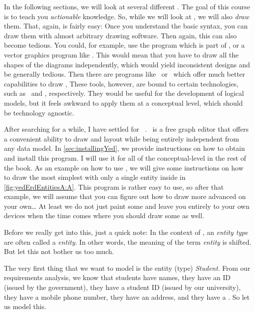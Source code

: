 In the following sections, we will look at several different .
The goal of this course is to teach you \emph{actionable} knowledge.
So, while we will look at , we will also \emph{draw} them.
That, again, is fairly easy:
Once you understand the basic syntax, you can draw them with almost arbitrary drawing software.
Then again, this can also become tedious.
You could, for example, use the  program which is part of \libreoffice, or a vector graphics program like \inkscape.
This would mean that you have to draw all the shapes of the diagrams independently, which would yield inconsistent designs and be generally tedious.
Then there are programs like \pgmodeler\ or \mysqlWorkbench\ which offer much better capabilities to draw ,
These tools, however, are bound to certain technologies, such as \postgresql\ and \mysql, respectively.
They would be useful for the development of logical models, but it feels awkward to apply them at a conceptual level, which should be technology agnostic.

After searching for a while, I have settled for \yEd~\cite{SG2015MDAWY,Y2011YGEM}.
\yEd\ is a free graph editor that offers a convenient ability to draw and layout  while being entirely independent from any data model.
In \cref{sec:installingYed}, we provide instructions on how to obtain and install this program.
I will use it for all of the conceptual-level  in the rest of the book.
As an example on how to use \yEd, we will give some instructions on how to draw the most simplest  with only a single entity inside in \cref{fig:yedErdEntitiesA:A}.
This program is rather easy to use, so after that example, we will assume that you can figure out how to draw more advanced  on your own\dots
At least we do not just paint some  and leave you entirely to your own devices when the time comes where you should draw some as well.

Before we really get into this, just a quick note:
In the context of , an \emph{entity type} are often called a \emph{entity}.
In other words, the meaning of the term \emph{entity} is shifted.
But let this not bother us too much.

The very first thing that we want to model is the entity (type) \emph{Student}.
From our requirements analysis, we know that students have names, they have an ID (issued by the government), they have a student ID (issued by our university), they have a mobile phone number, they have an address, and they have a .
So let us model this.

